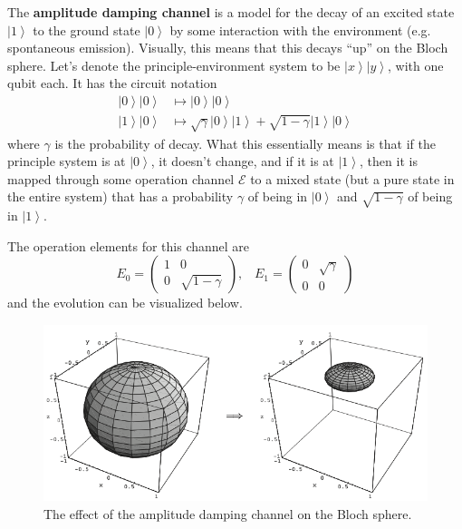 \documentclass{article}
\newcommand{\ket}[1]{\ensuremath{\left|#1\right\rangle}}
\begin{document}
    \begin{definition}
      The \textbf{amplitude damping channel} is a model for the decay of an excited state $\ket{1}$ to the ground state $\ket{0}$ by some interaction with the environment (e.g. spontaneous emission). Visually, this means that this decays ``up'' on the Bloch sphere. Let's denote the principle-environment system to be $\ket{x} \ket{y}$, with one qubit each. It has the circuit notation 
      \begin{align}
        \ket{0} \ket{0} & \mapsto \ket{0} \ket{0} \\ 
        \ket{1} \ket{0} & \mapsto \sqrt{\gamma} \ket{0} \ket{1} + \sqrt{1 - \gamma} \ket{1} \ket{0}
      \end{align}
      where $\gamma$ is the probability of decay. What this essentially means is that if the principle system is at $\ket{0}$, it doesn't change, and if it is at $\ket{1}$, then it is mapped through some operation channel $\mathcal{E}$ to a mixed state (but a pure state in the entire system) that has a probability $\gamma$ of being in $\ket{0}$ and $\sqrt{1 - \gamma}$ of being in $\ket{1}$. 
      \begin{figure}[H]
        \centering 
        \caption{} 
        \label{fig:amplitude_damping_circuit}
      \end{figure}
      The operation elements for this channel are 
      \begin{equation}
        E_0 = \begin{pmatrix} 1 & 0 \\ 0 & \sqrt{1 - \gamma} \end{pmatrix}, \;\;\; E_1 = \begin{pmatrix} 0 & \sqrt{\gamma} \\ 0 & 0 \end{pmatrix}
      \end{equation}
      and the evolution can be visualized below. 
      \begin{figure}[H]
        \centering 
        \includegraphics[scale=0.4]{img/amplitude_damping_channel.png}
        \caption{The effect of the amplitude damping channel on the Bloch sphere.} 
        \label{fig:amplitude_damping_channel}
      \end{figure}
    \end{definition}
\end{document}
